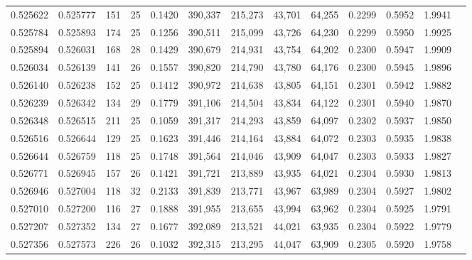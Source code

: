 \begin{tabular}{rrrrrrrrrrrrr}
0.525622 & 0.525777 &   151 &  25 &                                     0.1420 & 390,337 & 215,273 &  43,701 &  64,255 & 0.2299 & 0.5952 & 1.9941 \\
0.525784 & 0.525893 &   174 &  25 &                                     0.1256 & 390,511 & 215,099 &  43,726 &  64,230 & 0.2299 & 0.5950 & 1.9925 \\
0.525894 & 0.526031 &   168 &  28 &                                     0.1429 & 390,679 & 214,931 &  43,754 &  64,202 & 0.2300 & 0.5947 & 1.9909 \\
0.526034 & 0.526139 &   141 &  26 &                                     0.1557 & 390,820 & 214,790 &  43,780 &  64,176 & 0.2300 & 0.5945 & 1.9896 \\
0.526140 & 0.526238 &   152 &  25 &                                     0.1412 & 390,972 & 214,638 &  43,805 &  64,151 & 0.2301 & 0.5942 & 1.9882 \\
0.526239 & 0.526342 &   134 &  29 &                                     0.1779 & 391,106 & 214,504 &  43,834 &  64,122 & 0.2301 & 0.5940 & 1.9870 \\
0.526348 & 0.526515 &   211 &  25 &                                     0.1059 & 391,317 & 214,293 &  43,859 &  64,097 & 0.2302 & 0.5937 & 1.9850 \\
0.526516 & 0.526644 &   129 &  25 &                                     0.1623 & 391,446 & 214,164 &  43,884 &  64,072 & 0.2303 & 0.5935 & 1.9838 \\
0.526644 & 0.526759 &   118 &  25 &                                     0.1748 & 391,564 & 214,046 &  43,909 &  64,047 & 0.2303 & 0.5933 & 1.9827 \\
0.526771 & 0.526945 &   157 &  26 &                                     0.1421 & 391,721 & 213,889 &  43,935 &  64,021 & 0.2304 & 0.5930 & 1.9813 \\
0.526946 & 0.527004 &   118 &  32 &                                     0.2133 & 391,839 & 213,771 &  43,967 &  63,989 & 0.2304 & 0.5927 & 1.9802 \\
0.527010 & 0.527200 &   116 &  27 &                                     0.1888 & 391,955 & 213,655 &  43,994 &  63,962 & 0.2304 & 0.5925 & 1.9791 \\
0.527207 & 0.527352 &   134 &  27 &                                     0.1677 & 392,089 & 213,521 &  44,021 &  63,935 & 0.2304 & 0.5922 & 1.9779 \\
0.527356 & 0.527573 &   226 &  26 &                                     0.1032 & 392,315 & 213,295 &  44,047 &  63,909 & 0.2305 & 0.5920 & 1.9758 \\

\end{tabular}
